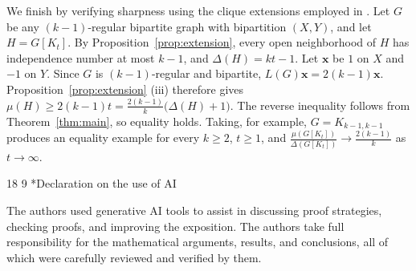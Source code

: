 \documentclass[11pt]{article}
\makeatletter
\renewcommand\section{\@startsection{section}{1}{\z@}%
{18\p@ \@plus 6\p@ \@minus 3\p@}%
{9\p@ \@plus 6\p@ \@minus 3\p@}%
{\large\bfseries\boldmath}}
\theoremstyle{plain}
\theoremstyle{definition}
\numberwithin{equation}{section}
\makeatother
\begin{document}
We finish by verifying sharpness using the clique extensions employed in
\cite{AharoniAlonBerger}. Let $G$ be any $(k-1)$-regular bipartite graph
with bipartition $(X,Y)$, and let $H=G[K_t]$. By
Proposition~\ref{prop:extension}, every open neighborhood of $H$ has
independence number at most $k-1$, and $\Delta(H)=kt-1$.
Let $\bm{x}$ be $1$ on $X$ and $-1$ on $Y$. Since $G$ is $(k-1)$-regular and bipartite, $L(G)\bm{x} = 2(k-1)\bm{x}$.
Proposition~\ref{prop:extension} (iii) therefore gives
$\mu(H)\geq 2(k-1)t = \frac{2(k-1)}{k}\big(\Delta(H) + 1\big)$.
The reverse inequality follows from Theorem~\ref{thm:main}, so equality holds.
Taking, for example, $G=K_{k-1,k-1}$ produces an equality example for every $k\geq 2$, $t\geq 1$, and
$\frac{\mu(G[K_t])}{\Delta(G[K_t])}\to\frac{2(k-1)}{k}$
as $t\to\infty$.


\section*{Declaration on the use of AI}

The authors used generative AI tools to assist in discussing proof strategies, checking proofs, and
improving the exposition. The authors take full responsibility for the mathematical arguments, results,
and conclusions, all of which were carefully reviewed and verified by them.
\end{document}
